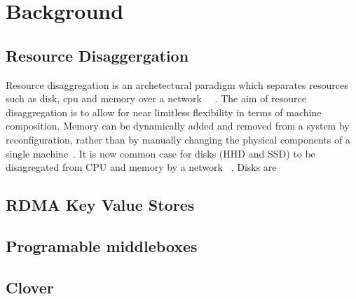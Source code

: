 \section{Background}


\subsection{Resource Disaggergation}

Resource disaggregation is an archetectural paradigm which separates resources
such as disk, cpu and memory over a network ~\cite{requirements for resource
dissagregation}~\cite{legoOS}. The aim of resource disaggregation is to allow
for near limitless flexibility in terms of machine composition. Memory can be
dynamically added and removed from a system by reconfiguration, rather than by
manually changing the physical components of a single machine~\cite{fastswap}.
It is now common case for disks (HHD and SSD) to be disagregated from CPU and
memory by a network ~\cite{decible}. Disks are 

\subsection{RDMA Key Value Stores}

\subsection{Programable middleboxes}

\subsection{Clover}
